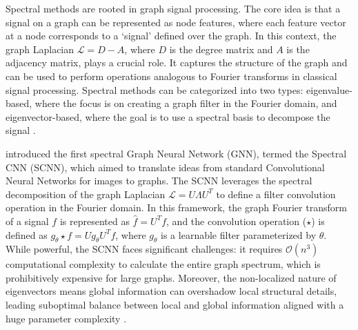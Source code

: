 Spectral methods are rooted in graph signal processing. The core idea is that a signal on a graph can be represented as node features, where each feature vector at a node corresponds to a `signal' defined over the graph. In this context, the graph Laplacian $\mathcal{L} = D - A$, where $D$ is the degree matrix and $A$ is the adjacency matrix, plays a crucial role. It captures the structure of the graph and can be used to perform operations analogous to Fourier transforms in classical signal processing. Spectral methods can be categorized into two types: eigenvalue-based, where the focus is on creating a graph filter in the Fourier domain, and eigenvector-based, where the goal is to use a spectral basis to decompose the signal \cite{bo2023surveyspectralgraphneural}.

 introduced the first spectral Graph Neural Network (GNN), termed the Spectral CNN (SCNN), which aimed to translate ideas from standard Convolutional Neural Networks for images to graphs. The SCNN leverages the spectral decomposition of the graph Laplacian $\mathcal{L} = U \Lambda U^T$ to define a filter convolution operation in the Fourier domain. In this framework, the graph Fourier transform of a signal $f$ is represented as $\hat{f} = U^T f$, and the convolution operation ($\star$) is defined as $g_{\theta} \star f = U g_{\theta} U^T f$, where $g_{\theta}$ is a learnable filter parameterized by $\theta$. While powerful, the SCNN faces significant challenges: it requires $\mathcal{O}(n^3)$ computational complexity to calculate the entire graph spectrum, which is prohibitively expensive for large graphs. Moreover, the non-localized nature of eigenvectors means global information can overshadow local structural details, leading suboptimal balance between local and global information aligned with a huge parameter complexity \cite{usgnn}.

